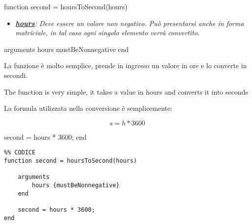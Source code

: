 

\label{T_9BEF2C28}

\label{H_F5B28984}

\begin{matlabcode}
function second = hoursToSecond(hours)
\end{matlabcode}


\begin{itemize}
\setlength{\itemsep}{-1ex}
   \item{\begin{flushleft} \underline{\textit{\textbf{hours}}}\textit{: Deve essere un valore non negativo. Può presentarsi anche in forma matriciale, in tal caso ogni singolo elemento verrà convertito.} \end{flushleft}}
\end{itemize}

\begin{matlabcode}
    arguments
        hours {mustBeNonnegative}
    end
\end{matlabcode}

\label{H_46431DC6}

\begin{par}
\begin{flushleft}
La funzione è molto semplice, prende in ingresso un valore in ore e lo converte in secondi.
\end{flushleft}
\end{par}

\begin{par}
\begin{flushleft}
The function is very simple, it takes a value in hours and converts it into seconds
\end{flushleft}
\end{par}

\begin{par}
\begin{flushleft}
La formula utilizzata nella conversione è semplicemente: 
\end{flushleft}
\end{par}

\begin{par}
$$s=h*3600$$
\end{par}

\begin{matlabcode}
    second = hours * 3600;
end
\end{matlabcode}

\begin{verbatim}
%% CODICE
function second = hoursToSecond(hours)
    
    arguments
        hours {mustBeNonnegative}
    end

    second = hours * 3600;
end
\end{verbatim}

